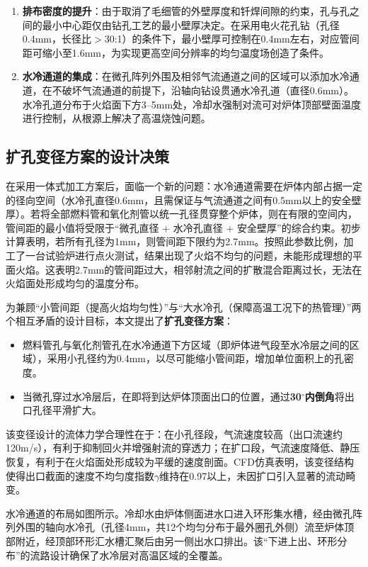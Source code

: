 \begin{enumerate}
	\item \textbf{排布密度的提升}：由于取消了毛细管的外壁厚度和钎焊间隙的约束，孔与孔之间的最小中心距仅由钻孔工艺的最小壁厚决定。在采用电火花孔钻（孔径0.4mm，长径比$>$30:1）的条件下，最小壁厚可控制在0.4mm左右，对应管间距可缩小至1.6mm，为实现更高空间分辨率的均匀温度场创造了条件。
	\item \textbf{水冷通道的集成}：在微孔阵列外围及相邻气流通道之间的区域可以添加水冷通道，在不破坏气流通道的前提下，沿轴向钻设贯通水冷孔道（直径0.6mm）。水冷孔道分布于火焰面下方3--5mm处，冷却水强制对流可对炉体顶部壁面温度进行控制，从根源上解决了高温烧蚀问题。
\end{enumerate}

\subsection{扩孔变径方案的设计决策}

在采用一体式加工方案后，面临一个新的问题：水冷通道需要在炉体内部占据一定的径向空间（水冷孔直径0.6mm，且需保证与气流通道之间有0.5mm以上的安全壁厚）。若将全部燃料管和氧化剂管以统一孔径贯穿整个炉体，则在有限的空间内，管间距的最小值将受限于“微孔直径 + 水冷孔直径 + 安全壁厚”的综合约束。初步计算表明，若所有孔径为1mm，则管间距下限约为2.7mm。按照此参数比例，加工了一台试验炉进行点火测试，结果出现了火焰不均匀的问题，未能形成理想的平面火焰。这表明2.7mm的管间距过大，相邻射流之间的扩散混合距离过长，无法在火焰面处形成均匀的温度分布。

为兼顾“小管间距（提高火焰均匀性）”与“大水冷孔（保障高温工况下的热管理）”两个相互矛盾的设计目标，本文提出了\textbf{扩孔变径方案}：

\begin{itemize}
	\item 燃料管孔与氧化剂管孔在水冷通道下方区域（即炉体进气段至水冷层之间的区域），采用小孔径约为0.4mm，以尽可能缩小管间距，增加单位面积上的孔密度。
	\item 当微孔穿过水冷层后，在即将到达炉体顶面出口的位置，通过\textbf{30$^\circ$内倒角}将出口孔径平滑扩大。
\end{itemize}

该变径设计的流体力学合理性在于：在小孔径段，气流速度较高（出口流速约120m/s），有利于抑制回火并增强射流的穿透力；在扩口段，气流速度降低、静压恢复，有利于在火焰面处形成较为平缓的速度剖面。CFD仿真表明，该变径结构使得出口截面的速度不均匀度指数$\gamma$维持在0.97以上，未因扩口引入显著的流动畸变。

水冷通道的布局如图所示。冷却水由炉体侧面进水口进入环形集水槽，经由微孔阵列外围的轴向水冷孔（孔径4mm，共12个均匀分布于最外圈孔外侧）流至炉体顶部附近，经顶部环形汇水槽汇聚后由另一侧出水口排出。该“下进上出、环形分布”的流路设计确保了水冷层对高温区域的全覆盖。

